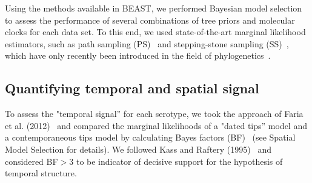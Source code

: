 \documentclass[10pt]{article}
\begin{document}
Using the methods available in BEAST, we performed Bayesian model selection to assess the performance of several combinations of tree priors and molecular clocks for each data set.
To this end, we used state-of-the-art marginal likelihood estimators, such as path sampling (PS)~\cite{LartillotPhilippe} and stepping-stone sampling (SS)~\cite{Xie}, which have only recently been introduced in the field of phylogenetics~\cite{LartillotPhilippe,Xie,Baele2012,Baele2013a,Baele2013b}.

\subsection*{Quantifying temporal and spatial signal} 

To assess the "temporal signal'' for each serotype, we took the approach of Faria et al. (2012)~\cite{Faria2012} and compared the marginal likelihoods of a "dated tips'' model and a contemporaneous tips model by calculating Bayes factors (BF)~\cite{Suchard2001,KassRaftery1995} (see Spatial Model Selection for details).
We followed Kass and Raftery (1995)~\cite{KassRaftery1995} and considered BF$>$3 to be indicator of decisive support for the hypothesis of temporal structure.
\end{document}
